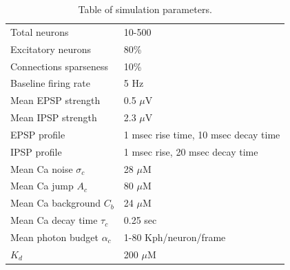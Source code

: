 \begin{table}[h!b!p!]
\caption{Table of simulation parameters.}\label{table:caparm}
\begin{tabular}{ll}
\hline
Total neurons & 10-500 \\
Excitatory neurons & 80\% \\
Connections sparseness & 10\% \\
Baseline firing rate & 5  Hz\\
Mean EPSP strength & 0.5 $\mu$V \\
Mean IPSP strength & 2.3 $\mu$V\\
EPSP profile & 1 msec rise time, 10 msec decay time \\
IPSP profile & 1 msec rise, 20 msec decay time \\
\hline
Mean Ca noise $\sigma_c$ & 28 $\mu$M \\
Mean Ca jump $A_c$ & 80 $\mu$M \\
Mean Ca background $C_b$ & 24 $\mu$M \\
Mean Ca decay time $\tau_c$ & 0.25 sec \\
Mean photon budget $\alpha_c$ & 1-80 Kph/neuron/frame \\
$K_d$ & 200 $\mu$M \\
\hline
\end{tabular}
\end{table}


